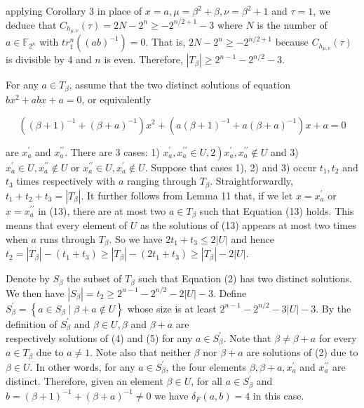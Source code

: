 \documentclass[10pt]{article}
\begin{document}
applying Corollary 3 in place of $x=a, \mu=\beta^{2}+\beta, \nu=\beta^{2}+1$ and $\tau=1$, we deduce that $C_{h_{\mu, \nu}}(\tau)=2 N-2^{n} \geq-2^{n / 2+1}-3$ where $N$ is the number of $a \in \mathbb{F}_{2^{n}}$ with $t r_{1}^{n}\left((a b)^{-1}\right)=0$. That is, $2 N-2^{n} \geq-2^{n / 2+1}$ because $C_{h_{\mu, \nu}}(\tau)$ is divisible by 4 and $n$ is even. Therefore, $\left|T_{\beta}\right| \geq 2^{n-1}-2^{n / 2}-3$.

For any $a \in T_{\beta}$, assume that the two distinct solutions of equation $b x^{2}+a b x+a=0$, or equivalently


\begin{equation*}
\left((\beta+1)^{-1}+(\beta+a)^{-1}\right) x^{2}+\left(a(\beta+1)^{-1}+a(\beta+a)^{-1}\right) x+a=0 \tag{13}
\end{equation*}


are $x_{a}^{\prime}$ and $x_{a}^{\prime \prime}$. There are 3 cases: 1) $\left.x_{a}^{\prime}, x_{a}^{\prime \prime} \in U, 2\right) x_{a}^{\prime}, x_{a}^{\prime \prime} \notin U$ and 3) $x_{a}^{\prime} \in U, x_{a}^{\prime \prime} \notin U$ or $x_{a}^{\prime \prime} \in U, x_{a}^{\prime} \notin U$. Suppose that cases 1), 2) and 3) occur $t_{1}, t_{2}$ and $t_{3}$ times respectively with $a$ ranging through $T_{\beta}$. Straightforwardly, $t_{1}+t_{2}+t_{3}=\left|T_{\beta}\right|$. It further follows from Lemma 11 that, if we let $x=x_{a}^{\prime}$ or $x=x_{a}^{\prime \prime}$ in (13), there are at most two $a \in T_{\beta}$ such that Equation (13) holds. This means that every element of $U$ as the solutions of (13) appears at most two times when $a$ runs through $T_{\beta}$. So we have $2 t_{1}+t_{3} \leq 2|U|$ and hence $t_{2}=\left|T_{\beta}\right|-\left(t_{1}+t_{3}\right) \geq\left|T_{\beta}\right|-\left(2 t_{1}+t_{3}\right) \geq\left|T_{\beta}\right|-2|U|$.

Denote by $S_{\beta}$ the subset of $T_{\beta}$ such that Equation (2) has two distinct solutions. We then have $\left|S_{\beta}\right|=t_{2} \geq 2^{n-1}-2^{n / 2}-2|U|-3$. Define $S_{\beta}^{\prime}=\left\{a \in S_{\beta} \mid \beta+a \notin U\right\}$ whose size is at least $2^{n-1}-2^{n / 2}-3|U|-3$. By the definition of $S_{\beta}^{\prime}$ and $\beta \in U, \beta$ and $\beta+a$ are\\
respectively solutions of (4) and (5) for any $a \in S_{\beta}^{\prime}$. Note that $\beta \neq \beta+a$ for every $a \in T_{\beta}$ due to $a \neq 1$. Note also that neither $\beta$ nor $\beta+a$ are solutions of (2) due to $\beta \in U$. In other words, for any $a \in S_{\beta}^{\prime}$, the four elements $\beta, \beta+a, x_{a}^{\prime}$ and $x_{a}^{\prime \prime}$ are distinct. Therefore, given an element $\beta \in U$, for all $a \in S_{\beta}^{\prime}$ and $b=(\beta+1)^{-1}+(\beta+a)^{-1} \neq 0$ we have $\delta_{F}(a, b)=4$ in this case.
\end{document}
